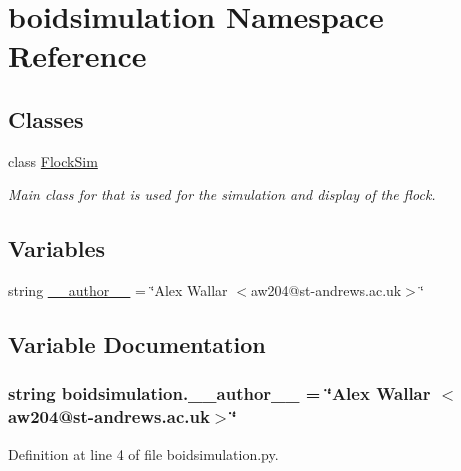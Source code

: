 \hypertarget{namespaceboidsimulation}{\section{boidsimulation Namespace Reference}
\label{namespaceboidsimulation}
}
\subsection*{Classes}
\begin{DoxyCompactItemize}
\item 
class \hyperlink{classboidsimulation_1_1FlockSim}{Flock\-Sim}
\begin{DoxyCompactList}\small\item\em Main class for that is used for the simulation and display of the flock. \end{DoxyCompactList}\end{DoxyCompactItemize}
\subsection*{Variables}
\begin{DoxyCompactItemize}
\item 
string \hyperlink{namespaceboidsimulation_a70f722357d7e5a4b5ac85e726863a7ef}{\-\_\-\-\_\-author\-\_\-\-\_\-} = \char`\"{}Alex Wallar $<$aw204@st-\/andrews.\-ac.\-uk$>$\char`\"{}
\end{DoxyCompactItemize}


\subsection{Variable Documentation}
\hypertarget{namespaceboidsimulation_a70f722357d7e5a4b5ac85e726863a7ef}{
\subsubsection[{\-\_\-\-\_\-author\-\_\-\-\_\-}]{\setlength{\rightskip}{0pt plus 5cm}string boidsimulation.\-\_\-\-\_\-author\-\_\-\-\_\- = \char`\"{}Alex Wallar $<$aw204@st-\/andrews.\-ac.\-uk$>$\char`\"{}}}\label{namespaceboidsimulation_a70f722357d7e5a4b5ac85e726863a7ef}


Definition at line 4 of file boidsimulation.\-py.

